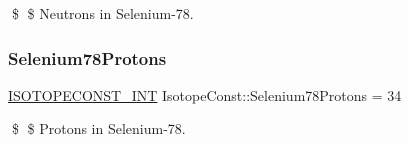 \$ \$ Neutrons in Selenium-\/78. \mbox{\label{group___isotope_const-_selenium-_se78_gad80d21eb8d62c6b1212475176fc8cdc3}} 
\subsubsection{\texorpdfstring{Selenium78\+Protons}{Selenium78Protons}}
{\footnotesize\ttfamily \mbox{\hyperlink{group___isotope_const-_macros_ga5f18360b3e99483a35c32d789e62621c}{I\+S\+O\+T\+O\+P\+E\+C\+O\+N\+S\+T\+\_\+\+I\+NT}} Isotope\+Const\+::\+Selenium78\+Protons = 34}

\$ \$ Protons in Selenium-\/78. 